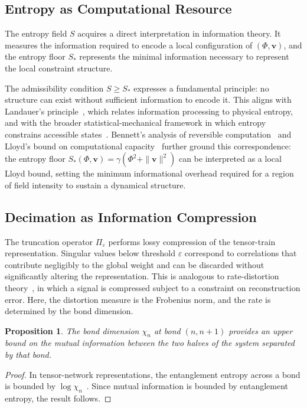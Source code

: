 \documentclass[11pt]{article}
\newtheorem{proposition}[theorem]{Proposition}
\theoremstyle{definition}
\begin{document}
\subsection{Entropy as Computational Resource}

The entropy field $S$ acquires a direct interpretation in information theory.
It measures the information required to encode a local configuration of
$(\Phi,\mathbf{v})$, and the entropy floor $S_*$ represents the minimal
information necessary to represent the local constraint structure.

The admissibility condition $S \ge S_*$ expresses a fundamental principle: no
structure can exist without sufficient information to encode it. This aligns
with Landauer's principle~\cite{landauer1961}, which relates information
processing to physical entropy, and with the broader statistical-mechanical
framework in which entropy constrains accessible states~\cite{jaynes1957}.
Bennett's analysis of reversible computation~\cite{bennett1982} and Lloyd's
bound on computational capacity~\cite{lloyd2000} further ground this
correspondence: the entropy floor $S_*(\Phi,\mathbf{v}) = \gamma(\Phi^2 +
\|\mathbf{v}\|^2)$ can be interpreted as a local Lloyd bound, setting the
minimum informational overhead required for a region of field intensity to
sustain a dynamical structure.

\subsection{Decimation as Information Compression}

The truncation operator $\Pi_\varepsilon$ performs lossy compression of the
tensor-train representation. Singular values below threshold $\varepsilon$
correspond to correlations that contribute negligibly to the global weight and
can be discarded without significantly altering the representation. This is
analogous to rate-distortion theory~\cite{coverthomas}, in which a signal is
compressed subject to a constraint on reconstruction error. Here, the
distortion measure is the Frobenius norm, and the rate is determined by the
bond dimension.

\begin{proposition}
  The bond dimension $\chi_n$ at bond $(n,n+1)$ provides an upper bound on the
  mutual information between the two halves of the system separated by that
  bond.
\end{proposition}

\begin{proof}
  In tensor-network representations, the entanglement entropy across a bond is
  bounded by $\log \chi_n$~\cite{schollwock2011dmrg}. Since mutual information
  is bounded by entanglement entropy, the result follows.
\end{proof}
\end{document}
